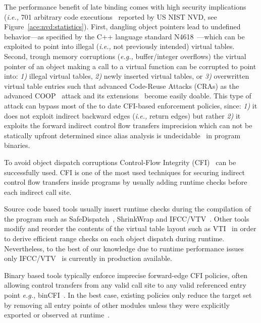 The performance benefit of late binding comes with high security implications (\textit{i.e.,} 701 arbitrary code executions~\cite{NVD:ACE} reported by US NIST NVD, see Figure~\ref{ace:nvd:statistics}).
First, dangling object pointers lead to undefined behavior---as specified by the C++ language standard N4618~\cite{N4618}---which can be exploited to point into illegal (\textit{i.e.,} not previously intended) virtual tables.
Second, trough memory corruptions (\textit{e.g.,} buffer/integer overflows) the virtual pointer of an object making a call to a virtual function can be corrupted to point into:
\textit{1)} illegal virtual tables, 
\textit{2)} newly inserted virtual tables, or
\textit{3)} overwritten virtual table entries
such that advanced Code-Reuse Attacks (CRAs) as the advanced COOP~\cite{schuster:coop} attack
and its extensions~\cite{crane:readactor++, crane:readactor++, subversive-c:lettner, ctf:coop, loop:oriented} 
become easily doable. This type of attack can bypass most of the to date CFI-based enforcement policies, since:
\textit{1)} it does not exploit indirect backward edges (\textit{i.e.,} return edges) but rather
\textit{2)} it exploits the forward indirect control flow transfers imprecision which can not be statically upfront 
determined since alias analysis is undecidable~\cite{alias:undecidable} in program binaries.

To avoid object dispatch corruptions Control-Flow Integrity (CFI)~\cite{abadi:cfi2, abadi:cfi} can be successfully used.
CFI is one of the most used techniques for securing indirect control flow transfers inside programs
by usually adding runtime checks before each indirect call site.

Source code based tools usually insert runtime checks during the compilation of 
the program such as SafeDispatch~\cite{safedispatch:jang}, ShrinkWrap \cite{haller:shrinkwrap} and IFCC/VTV~\cite{vtv:tice}.
Other tools modify and reorder the contents of the virtual table layout such as VTI~\cite{bounov:interleaving} 
in order to derive efficient range checks on each object dispatch during runtime. Nevertheless, to the best of our knowledge 
due to runtime performance issues only IFCC/VTV~\cite{vtv:tice} is currently in production available.

Binary based tools typically enforce imprecise forward-edge CFI 
policies, often allowing control transfers from any valid call site 
to any valid referenced entry point \textit{e.g.,} binCFI~\cite{ccfir:zhang, zhang:usenix}. 
In the best case, existing policies only reduce the target set by
removing all entry points of other modules unless they were
explicitly exported or observed at runtime~\cite{payer:dimva}. 

